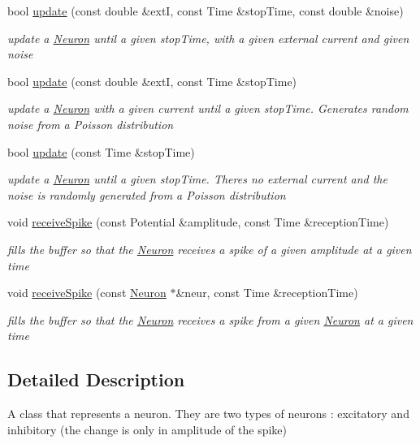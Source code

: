 \begin{DoxyCompactItemize}
bool \hyperlink{classNeuron_aa21dce996e08173d864c9f4b0198a793}{update} (const double \&extI, const Time \&stop\+Time, const double \&noise)
\begin{DoxyCompactList}\small\item\em update a \hyperlink{classNeuron}{Neuron} until a given stop\+Time, with a given external current and given noise \end{DoxyCompactList}\item 
bool \hyperlink{classNeuron_a9692066fbcd0d632246970c627784341}{update} (const double \&extI, const Time \&stop\+Time)
\begin{DoxyCompactList}\small\item\em update a \hyperlink{classNeuron}{Neuron} with a given current until a given stop\+Time. Generates random noise from a Poisson distribution \end{DoxyCompactList}\item 
bool \hyperlink{classNeuron_ae2e3e2ebf571a295c2858ee48efbecce}{update} (const Time \&stop\+Time)
\begin{DoxyCompactList}\small\item\em update a \hyperlink{classNeuron}{Neuron} until a given stop\+Time. There\textquotesingle{}s no external current and the noise is randomly generated from a Poisson distribution \end{DoxyCompactList}\item 
void \hyperlink{classNeuron_a8e54b7a86764bd1445f8a8105c3ba5e2}{receive\+Spike} (const Potential \&amplitude, const Time \&reception\+Time)
\begin{DoxyCompactList}\small\item\em fills the buffer so that the \hyperlink{classNeuron}{Neuron} receives a spike of a given amplitude at a given time \end{DoxyCompactList}\item 
void \hyperlink{classNeuron_aa2fb0abb3108ee6cec39773d3f7a0761}{receive\+Spike} (const \hyperlink{classNeuron}{Neuron} $\ast$\&neur, const Time \&reception\+Time)
\begin{DoxyCompactList}\small\item\em fills the buffer so that the \hyperlink{classNeuron}{Neuron} receives a spike from a given \hyperlink{classNeuron}{Neuron} at a given time \end{DoxyCompactList}\end{DoxyCompactItemize}


\subsection{Detailed Description}
A class that represents a neuron. They are two types of neurons \+: excitatory and inhibitory (the change is only in amplitude of the spike) 

